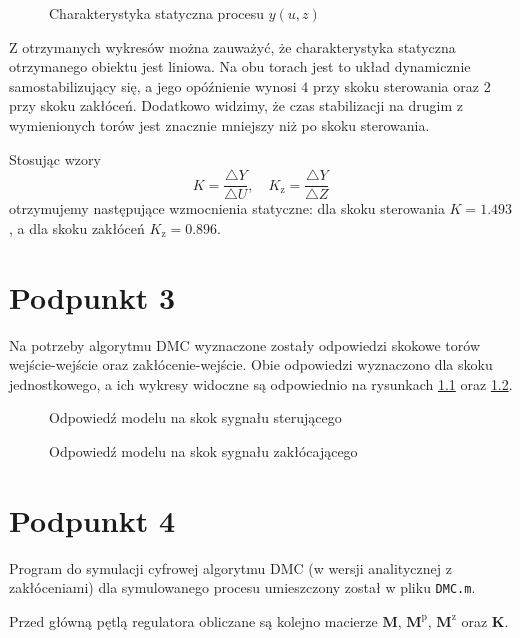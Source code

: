 \begin{figure}[ht]
\centering

\caption{Charakterystyka statyczna procesu $y(u,z)$}
\label{Z2c}
\end{figure}


Z otrzymanych wykresów można zauważyć, że charakterystyka statyczna otrzymanego obiektu jest liniowa. Na obu torach jest to układ dynamicznie samostabilizujący się, a jego opóźnienie wynosi $ \num{4} $ przy skoku sterowania oraz $ \num{2} $ przy skoku zakłóceń. Dodatkowo widzimy, że czas stabilizacji na drugim z wymienionych torów jest znacznie mniejszy niż po skoku sterowania.

Stosując wzory
\begin{equation}
K = \frac{ \triangle Y }{ \triangle U},\quad K_{\mathrm{z}} = \frac{\triangle Y}{\triangle Z}
\end{equation}
otrzymujemy następujące wzmocnienia statyczne: dla skoku sterowania $ K = \num{1,493} $, a dla skoku zakłóceń $ K_\mathrm{z} = \num{0,896} $.


\chapter{Podpunkt 3}
Na potrzeby algorytmu DMC wyznaczone zostały odpowiedzi skokowe torów wejście-wejście oraz zakłócenie-wejście. Obie odpowiedzi wyznaczono dla skoku jednostkowego, a ich wykresy widoczne są odpowiednio na rysunkach \ref{Z3a} oraz \ref{Z3b}.

\begin{figure}[ht]
\centering

\caption{Odpowiedź modelu na skok sygnału sterującego}
\label{Z3a}
\end{figure}

\begin{figure}[ht]
\centering

\caption{Odpowiedź modelu na skok sygnału zakłócającego}
\label{Z3b}
\end{figure}


\chapter{Podpunkt 4}
Program do symulacji cyfrowej algorytmu DMC (w wersji analitycznej z zakłóceniami) dla symulowanego procesu umieszczony został w pliku \verb+DMC.m+.

Przed główną pętlą regulatora obliczane są kolejno macierze $ \boldsymbol{M} $, $ \boldsymbol{M}^\mathrm{p}$, $ \boldsymbol{M}^\mathrm{z} $ oraz $ \boldsymbol{K} $.


